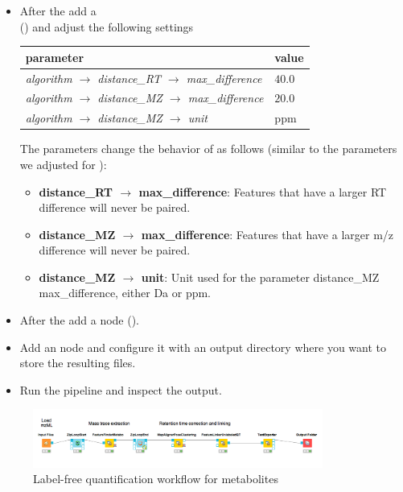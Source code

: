 \begin{itemize}
\item
After the  add a  \\
 () and adjust the following settings

\begin{center}
\begin{tabular}{l|l}
\textbf{parameter} & \textbf{value} \\ \hline
\textit{algorithm $\rightarrow$ distance\_RT $\rightarrow$ max\_difference} & $40.0$ \\
\textit{algorithm $\rightarrow$ distance\_MZ $\rightarrow$ max\_difference} & $20.0$ \\
\textit{algorithm $\rightarrow$ distance\_MZ $\rightarrow$ unit} & ppm
\end{tabular}
\end{center}

\noindent The parameters change the behavior of  as follows (similar to the parameters we adjusted for ):
\begin{itemize}
\item \textbf{distance\_RT $\rightarrow$ max\_difference}: Features that have a larger RT difference will never be paired.
\item \textbf{distance\_MZ $\rightarrow$ max\_difference}: Features that have a larger m/z difference will never be paired.
\item \textbf{distance\_MZ $\rightarrow$ unit}: Unit used for the parameter distance\_MZ max\_difference, either Da or ppm.
\end{itemize}

\item
After the  add a  node ().
\item
Add an  node and configure it with an output directory where you want to store the resulting files.
\item
Run the pipeline and inspect the output.
\end{itemize}

\begin{figure}[htbp]
  \centering
  \includegraphics[width=0.85\textwidth]{graphics/metabo/metabo_part1_with_labels.png}
  \caption{Label-free quantification workflow for metabolites}
  \label{fig:metabo_part1}
\end{figure}

